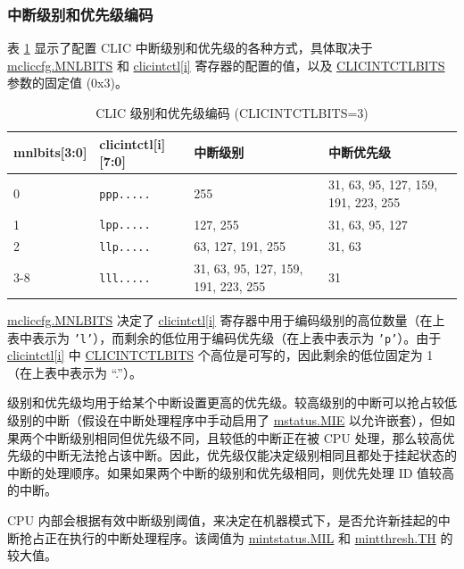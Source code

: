 \documentclass[main\_\_CN.tex]{subfiles}
\begin{document}
\hypertarget{riscvcpu-clic-int-level-prio}{}
 \subsubsection{中断级别和优先级编码}
\label{sec:riscvcpu-clic-int-level-prio}

表 \ref{tab:riscv-clic-level-priority} 显示了配置 CLIC 中断级别和优先级的各种方式，具体取决于 \hyperref[fielddesc:MCLICCFG_MNLBITS]{mcliccfg.MNLBITS} 和 \hyperref[regdesc:MCLICINTCTL_REG_i]{clicintctl[i]} 寄存器的配置的值，以及 \hyperref[fielddesc:CLICINFO_CLICINTCTLBITS]{CLICINTCTLBITS} 参数的固定值 (0x3)。

\begin{longtable}{ | l | l | l | l | }
\caption{CLIC 级别和优先级编码 (CLICINTCTLBITS=3)}
\label{tab:riscv-clic-level-priority}
\\\hline
\rowcolor{lightgray}
mnlbits[3:0] & clicintctl[i][7:0] & 中断级别 & 中断优先级 \\ \hline
0   & \texttt{ppp.....} & 255 & 31, 63, 95, 127, 159, 191, 223, 255 \\ \hline
1   & \texttt{lpp.....} & 127, 255 & 31, 63, 95, 127 \\ \hline
2   & \texttt{llp.....} & 63, 127, 191, 255 & 31, 63 \\ \hline
3-8 & \texttt{lll.....} & 31, 63, 95, 127, 159, 191, 223, 255 & 31 \\ \hline
\end{longtable}

\hyperref[fielddesc:MCLICCFG_MNLBITS]{mcliccfg.MNLBITS} 决定了 \hyperref[regdesc:MCLICINTCTL_REG_i]{clicintctl[i]} 寄存器中用于编码级别的高位数量（在上表中表示为 \texttt{'l'}），而剩余的低位用于编码优先级（在上表中表示为 \texttt{'p'}）。由于 \hyperref[regdesc:MCLICINTCTL_REG_i]{clicintctl[i]} 中 \hyperref[fielddesc:CLICINFO_CLICINTCTLBITS]{CLICINTCTLBITS} 个高位是可写的，因此剩余的低位固定为 1（在上表中表示为 ``.”）。

级别和优先级均用于给某个中断设置更高的优先级。较高级别的中断可以抢占较低级别的中断（假设在中断处理程序中手动启用了 \hyperref[fielddesc:MSTATUSMIE]{mstatus.MIE} 以允许嵌套），但如果两个中断级别相同但优先级不同，且较低的中断正在被 CPU 处理，那么较高优先级的中断无法抢占该中断。因此，优先级仅能决定级别相同且都处于挂起状态的中断的处理顺序。如果如果两个中断的级别和优先级相同，则优先处理 ID 值较高的中断。


CPU 内部会根据有效中断级别阈值，来决定在机器模式下，是否允许新挂起的中断抢占正在执行的中断处理程序。该阈值为 \hyperref[fielddesc:MINTSTATUS_MIL]{{mintstatus.MIL}} 和 \hyperref[fielddesc:MINTTHRESH_TH]{{mintthresh.TH}} 的较大值。
\end{document}

